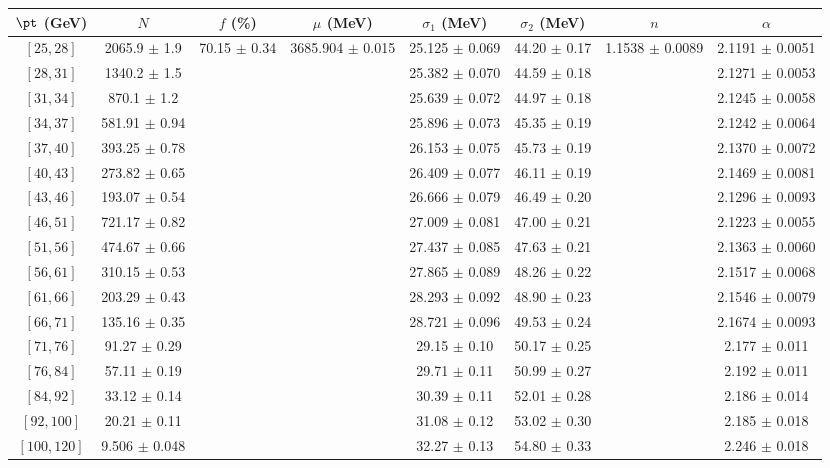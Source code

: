\begin{tabular}{c||c|c|c|c|c|c|c}
$\pt$ (GeV) & $N$ & $f$ (\%) & $\mu$ (MeV) & $\sigma_1$ (MeV) & $\sigma_2$ (MeV) & $n$ & $\alpha$ \\
\hline
$[25, 28]$ & 2065.9 $\pm$ 1.9 & \multirow{17}{*}{70.15 $\pm$ 0.34} & \multirow{17}{*}{3685.904 $\pm$ 0.015} & 25.125 $\pm$ 0.069 & 44.20 $\pm$ 0.17 & \multirow{17}{*}{1.1538 $\pm$ 0.0089} & 2.1191 $\pm$ 0.0051\\
$[28, 31]$ & 1340.2 $\pm$ 1.5 &  &  & 25.382 $\pm$ 0.070 & 44.59 $\pm$ 0.18 &  & 2.1271 $\pm$ 0.0053\\
$[31, 34]$ & 870.1 $\pm$ 1.2 &  &  & 25.639 $\pm$ 0.072 & 44.97 $\pm$ 0.18 &  & 2.1245 $\pm$ 0.0058\\
$[34, 37]$ & 581.91 $\pm$ 0.94 &  &  & 25.896 $\pm$ 0.073 & 45.35 $\pm$ 0.19 &  & 2.1242 $\pm$ 0.0064\\
$[37, 40]$ & 393.25 $\pm$ 0.78 &  &  & 26.153 $\pm$ 0.075 & 45.73 $\pm$ 0.19 &  & 2.1370 $\pm$ 0.0072\\
$[40, 43]$ & 273.82 $\pm$ 0.65 &  &  & 26.409 $\pm$ 0.077 & 46.11 $\pm$ 0.19 &  & 2.1469 $\pm$ 0.0081\\
$[43, 46]$ & 193.07 $\pm$ 0.54 &  &  & 26.666 $\pm$ 0.079 & 46.49 $\pm$ 0.20 &  & 2.1296 $\pm$ 0.0093\\
$[46, 51]$ & 721.17 $\pm$ 0.82 &  &  & 27.009 $\pm$ 0.081 & 47.00 $\pm$ 0.21 &  & 2.1223 $\pm$ 0.0055\\
$[51, 56]$ & 474.67 $\pm$ 0.66 &  &  & 27.437 $\pm$ 0.085 & 47.63 $\pm$ 0.21 &  & 2.1363 $\pm$ 0.0060\\
$[56, 61]$ & 310.15 $\pm$ 0.53 &  &  & 27.865 $\pm$ 0.089 & 48.26 $\pm$ 0.22 &  & 2.1517 $\pm$ 0.0068\\
$[61, 66]$ & 203.29 $\pm$ 0.43 &  &  & 28.293 $\pm$ 0.092 & 48.90 $\pm$ 0.23 &  & 2.1546 $\pm$ 0.0079\\
$[66, 71]$ & 135.16 $\pm$ 0.35 &  &  & 28.721 $\pm$ 0.096 & 49.53 $\pm$ 0.24 &  & 2.1674 $\pm$ 0.0093\\
$[71, 76]$ & 91.27 $\pm$ 0.29 &  &  & 29.15 $\pm$ 0.10 & 50.17 $\pm$ 0.25 &  & 2.177 $\pm$ 0.011\\
$[76, 84]$ & 57.11 $\pm$ 0.19 &  &  & 29.71 $\pm$ 0.11 & 50.99 $\pm$ 0.27 &  & 2.192 $\pm$ 0.011\\
$[84, 92]$ & 33.12 $\pm$ 0.14 &  &  & 30.39 $\pm$ 0.11 & 52.01 $\pm$ 0.28 &  & 2.186 $\pm$ 0.014\\
$[92, 100]$ & 20.21 $\pm$ 0.11 &  &  & 31.08 $\pm$ 0.12 & 53.02 $\pm$ 0.30 &  & 2.185 $\pm$ 0.018\\
$[100, 120]$ & 9.506 $\pm$ 0.048 &  &  & 32.27 $\pm$ 0.13 & 54.80 $\pm$ 0.33 &  & 2.246 $\pm$ 0.018\\
\end{tabular}
